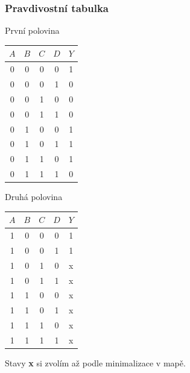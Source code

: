 	\begin{frame}
    \frametitle{Pravdivostní tabulka}
		\boldmath
		
		\begin{minipage}[t][0.7\textheight][t]{0.45\textwidth}
		\vspace{5mm}
		
		První polovina
		\begin{center}
			\begin{tabular}{ c c c c | c }
				$A$ & $B$ & $C$ & $D$ & $Y$\\
				\hline
				0 & 0 & 0 & 0 & 1 \\
				0 & 0 & 0 & 1 & 0 \\
				0 & 0 & 1 & 0 & 0\\
				0 & 0 & 1 & 1 & 0\\
				0 & 1 & 0 & 0 & 1 \\
				0 & 1 & 0 & 1 & 1 \\
				0 & 1 & 1 & 0 & 1 \\
				0 & 1 & 1 & 1 & 0 \\
			\end{tabular}
		\end{center}

		\end{minipage}
		\begin{minipage}[t][0.7\textheight][t]{0.45\textwidth}
    \vspace{5mm}
		
		Druhá polovina
		\begin{center}
			\begin{tabular}{ c c c c | c }
				$A$ & $B$ & $C$ & $D$ & $Y$\\
				\hline
				1 & 0 & 0 & 0 & 1 \\
				1 & 0 & 0 & 1 & 1 \\
			  1 & 0 & 1 & 0 & x \\
				1 & 0 & 1 & 1 & x \\
				1 & 1 & 0 & 0 & x \\
				1 & 1 & 0 & 1 & x \\
				1 & 1 & 1 & 0 & x \\
				1 & 1 & 1 & 1 & x \\
			\end{tabular}
		\end{center}
		\end{minipage}
		
		Stavy \textbf{x} si zvolím až podle minimalizace v mapě.
	\end{frame}
	
